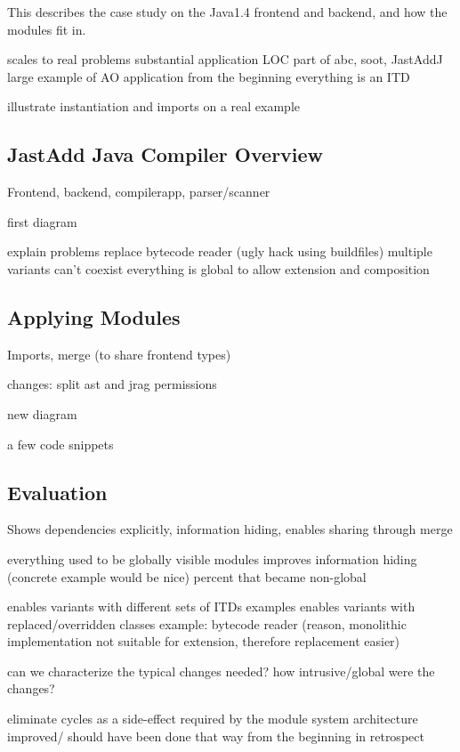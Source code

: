 This describes the case study on the Java1.4 frontend and
backend, and how the modules fit in.

scales to real problems
  substantial application
    LOC
    part of abc, soot, JastAddJ
  large example of AO application from the beginning
    everything is an ITD

illustrate instantiation and imports on a real example

\subsection{JastAdd Java Compiler Overview}

Frontend, backend, compilerapp, parser/scanner

first diagram

explain problems
  replace bytecode reader (ugly hack using buildfiles)
  multiple variants can't coexist
  everything is global to allow extension and composition


\subsection{Applying Modules}

Imports, merge (to share frontend types)

changes:
split ast and jrag
permissions

new diagram

a few code snippets

\subsection{Evaluation}

Shows dependencies explicitly, information hiding, enables sharing through merge

everything used to be globally visible
  modules improves information hiding 
    (concrete example would be nice)
    percent that became non-global

enables variants with different sets of ITDs
  examples
enables variants with replaced/overridden classes
  example: bytecode reader
  (reason, monolithic implementation not suitable for extension, therefore
  replacement easier)

can we characterize the typical changes needed?
how intrusive/global were the changes?

eliminate cycles as a side-effect
  required by the module system
  architecture improved/ should have been done that way from the beginning
  in retrospect





 
 
